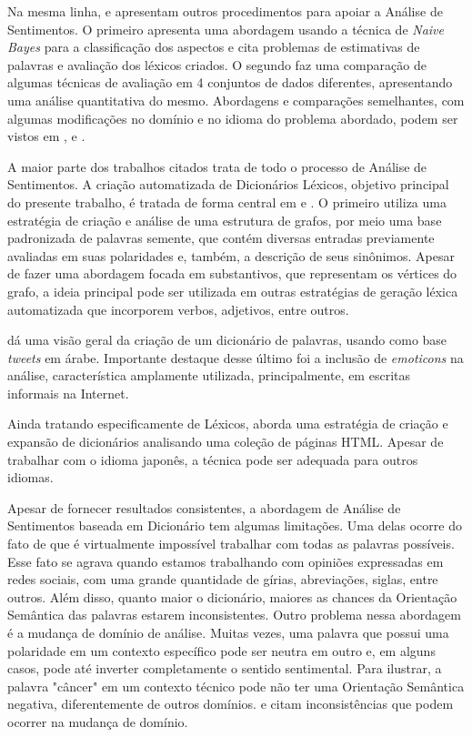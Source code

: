 \documentclass[a4paper,11pt]{article}
\begin{document}
Na mesma linha, \cite{eisenstein2016unsupervised} e \cite{bandhakavi2016lexicon} apresentam outros procedimentos para apoiar a Análise de Sentimentos. O primeiro apresenta uma abordagem usando a técnica de \emph{Naive Bayes} para a classificação dos aspectos e cita problemas de estimativas de palavras e avaliação dos léxicos criados. O segundo faz uma comparação de algumas técnicas de avaliação em 4 conjuntos de dados diferentes, apresentando uma análise quantitativa do mesmo. Abordagens e comparações semelhantes, com algumas modificações no domínio e no idioma do problema abordado, podem ser vistos em \cite{khoo2017lexicon}, \cite{asghar2014review} e \cite{ding2008holistic}.

A maior parte dos trabalhos citados trata de todo o processo de Análise de Sentimentos. A criação automatizada de Dicionários Léxicos, objetivo principal do presente trabalho, é tratada de forma central em \cite{widdows2002graph} e \cite{duwairi2015detecting}. O primeiro utiliza uma estratégia de criação e análise de uma estrutura de grafos, por meio uma base padronizada de palavras semente, que contém diversas entradas previamente avaliadas em suas polaridades e, também, a descrição de seus sinônimos. Apesar de fazer uma abordagem focada em substantivos, que representam os vértices do grafo, a ideia principal pode ser utilizada em outras estratégias de geração léxica automatizada que incorporem verbos, adjetivos, entre outros. 

\cite{duwairi2015detecting} dá uma visão geral da criação de um dicionário de palavras, usando como base \emph{tweets} em árabe. Importante destaque desse último foi a inclusão de \emph{emoticons} na análise, característica amplamente utilizada, principalmente, em escritas informais na Internet.

Ainda tratando especificamente de Léxicos, \cite{kaji} aborda uma estratégia de criação e expansão de dicionários analisando uma coleção de páginas HTML. Apesar de trabalhar com o idioma japonês, a técnica pode ser adequada para outros idiomas.

Apesar de fornecer resultados consistentes, a abordagem de Análise de Sentimentos baseada em Dicionário tem algumas limitações. Uma delas ocorre do fato de que é virtualmente impossível trabalhar com todas as palavras possíveis. Esse fato se agrava quando estamos trabalhando com opiniões expressadas em redes sociais, com uma grande quantidade de gírias, abreviações, siglas, entre outros. Além disso, quanto maior o dicionário, maiores as chances da Orientação Semântica das palavras estarem inconsistentes. Outro problema nessa abordagem é a mudança de domínio de análise. Muitas vezes, uma palavra que possui uma polaridade em um contexto específico pode ser neutra em outro e, em alguns casos, pode até inverter completamente o sentido sentimental. Para ilustrar, a palavra "câncer" em um contexto técnico pode não ter uma Orientação Semântica negativa, diferentemente de outros domínios. \cite{kdir16} e \cite{Abbasi} citam inconsistências que podem ocorrer na mudança de domínio.
\end{document}
